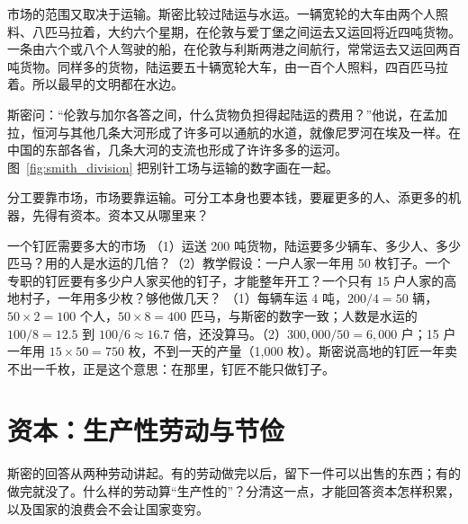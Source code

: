 市场的范围又取决于运输。斯密比较过陆运与水运。一辆宽轮的大车由两个人照料、八匹马拉着，大约六个星期，在伦敦与爱丁堡之间运去又运回将近四吨货物。一条由六个或八个人驾驶的船，在伦敦与利斯两港之间航行，常常运去又运回两百吨货物。同样多的货物，陆运要五十辆宽轮大车，由一百个人照料，四百匹马拉着\cite{smith1776}。所以最早的文明都在水边。

斯密问：“伦敦与加尔各答之间，什么货物负担得起陆运的费用？”他说，在孟加拉，恒河与其他几条大河形成了许多可以通航的水道，就像尼罗河在埃及一样。在中国的东部各省，几条大河的支流也形成了许许多多的运河\cite{smith1776}。图~\ref{fig:smith_division} 把别针工场与运输的数字画在一起。

分工要靠市场，市场要靠运输。可分工本身也要本钱，要雇更多的人、添更多的机器，先得有资本。资本又从哪里来？


\begin{example}{一个钉匠需要多大的市场}\label{ex:smith-market}
（1）运送 200 吨货物，陆运要多少辆车、多少人、多少匹马？用的人是水运的几倍？（2）教学假设：一户人家一年用 50 枚钉子。一个专职的钉匠要有多少户人家买他的钉子，才能整年开工？一个只有 15 户人家的高地村子，一年用多少枚？够他做几天？
\solution （1）每辆车运 4 吨，$200/4=50$ 辆，$50\times2=100$ 个人，$50\times8=400$ 匹马，与斯密的数字一致；人数是水运的 $100/8=12.5$ 到 $100/6\approx16.7$ 倍，还没算马。（2）$300{,}000/50=6{,}000$ 户；15 户一年用 $15\times50=750$ 枚，不到一天的产量（1,000 枚）。斯密说高地的钉匠一年卖不出一千枚，正是这个意思：在那里，钉匠不能只做钉子。
\end{example}

\section{资本：生产性劳动与节俭}\label{sec:smith-capital}

斯密的回答从两种劳动讲起。有的劳动做完以后，留下一件可以出售的东西；有的做完就没了。什么样的劳动算“生产性的”？分清这一点，才能回答资本怎样积累，以及国家的浪费会不会让国家变穷。

